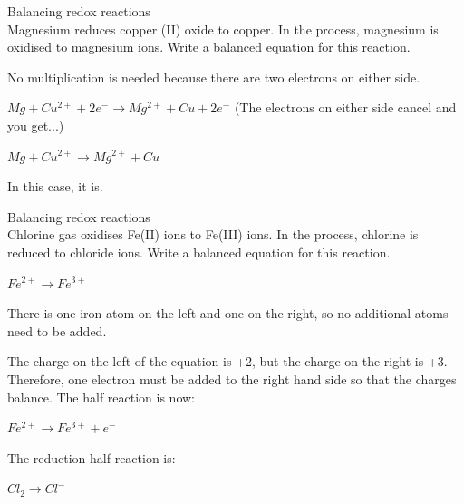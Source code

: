 \begin{wex}{Balancing redox reactions\\}{Magnesium reduces copper (II) oxide to copper. In the process, magnesium is oxidised to magnesium ions. Write a balanced equation for this reaction.\\}
{No multiplication is needed because there are two electrons on either side.\\

\begin{center}
\rm${Mg + Cu^{2+} + 2e^{-} \rightarrow Mg^{2+} + Cu + 2e^{-}}$ (The electrons on either side cancel and you get...)

\rm${Mg + Cu^{2+} \rightarrow Mg^{2+} + Cu}$\\
\end{center}

In this case, it is.
}
\end{wex}


\begin{wex}{Balancing redox reactions\\}{Chlorine gas oxidises Fe(II) ions to Fe(III) ions. In the process, chlorine is reduced to chloride ions. Write a balanced equation for this reaction.\\}

{

\begin{center}
\rm${Fe^{2+} \rightarrow Fe^{3+}}$\\
\end{center}

There is one iron atom on the left and one on the right, so no additional atoms need to be added.\\

The charge on the left of the equation is +2, but the charge on the right is +3. Therefore, one electron must be added to the right hand side so that the charges balance. The half reaction is now:

\begin{center}
\rm${Fe^{2+} \rightarrow Fe^{3+} + e^{-}}$\\
\end{center}

The reduction half reaction is:

\begin{center}
\rm${Cl_{2} \rightarrow Cl^{-}}$
\end{center}

}
\end{wex}
